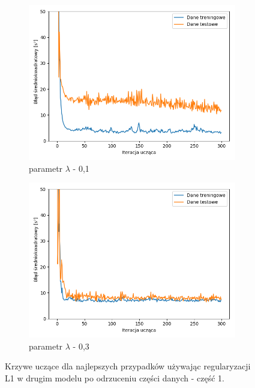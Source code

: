 \documentclass[12pt]{aghdpl}
\begin{document}
		\begin{figure}[h]
			\centering
			\begin{subfigure}{.8\linewidth}
		 		\includegraphics[width =\linewidth]{wykresy/7_badanie_danych/l1/regularyzacja_0_1_wykres_uczenia.png}
		 		\caption{parametr $\lambda$ - 0,1}
		 	\end{subfigure}
		 	\begin{subfigure}{.8\linewidth}
		 		\includegraphics[width =\linewidth]{wykresy/7_badanie_danych/l1/regularyzacja_0_3_wykres_uczenia.png}
		 		\caption{parametr $\lambda$ - 0,3}
		 	\end{subfigure}
		 	
		 	\caption{Krzywe uczące dla najlepszych przypadków używając regularyzacji L1 w drugim modelu po odrzuceniu części danych - część 1.}
			\label{fig: drugi_model_przy_regularyzacji_l1_po_odrzuceniu_czesci_danych_wykresy_uczenia_1}
		\end{figure}
		
\end{document}
